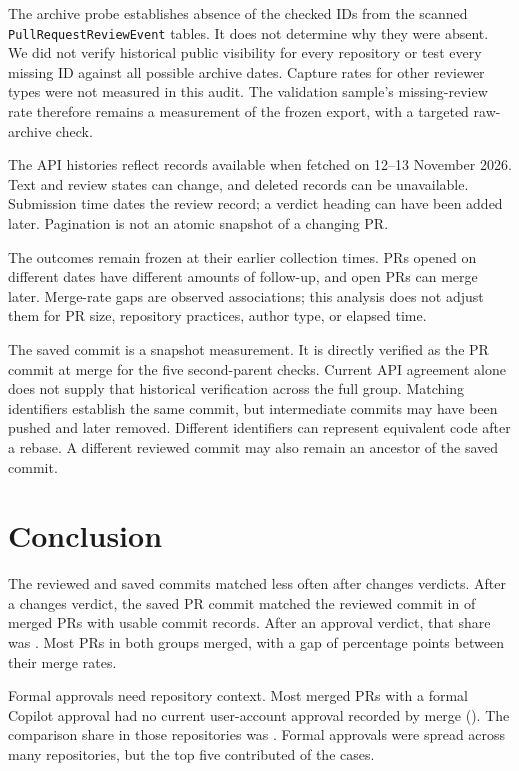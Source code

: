 \documentclass[11pt,letterpaper]{article}
\begin{document}
The archive probe establishes absence of the checked IDs from the
scanned \texttt{PullRequestReviewEvent} tables. It does not determine why
they were absent. We did not verify historical public visibility for
every repository or test every missing ID against all possible archive
dates. Capture rates for other reviewer types were not measured in this
audit. The validation sample's missing-review rate therefore remains
a measurement of the frozen export, with a targeted raw-archive check.

The API histories reflect records available when fetched on
12--13 November 2026. Text and review states can change, and deleted
records can be unavailable. Submission time dates the review record;
a verdict heading can have been added later. Pagination is not an
atomic snapshot of a changing PR.

The outcomes remain frozen at their earlier collection times. PRs
opened on different dates have different amounts of follow-up, and open
PRs can merge later. Merge-rate gaps are observed associations; this
analysis does not adjust them for PR size, repository practices,
author type, or elapsed time.

The saved commit is a snapshot measurement. It is directly verified as
the PR commit at merge for the five second-parent checks. Current API
agreement alone does not supply that historical verification across
the full group. Matching identifiers establish the same commit, but
intermediate commits may have been pushed and later removed. Different
identifiers can represent equivalent code after a rebase. A different
reviewed commit may also remain an ancestor of the saved commit.

\section{Conclusion}

The reviewed and saved commits matched less often after changes verdicts.
After a changes verdict, the saved PR commit matched the reviewed commit
in \ChangesMatchRate{} of merged PRs with usable commit records. After an
approval verdict, that share was \ReadyMatchRate{}. Most PRs in both
groups merged, with a gap of \MergeGapPP{} percentage points between
their merge rates.

Formal approvals need repository context. Most merged PRs with a formal
Copilot approval had no current user-account approval recorded by merge
(\FormalNoUserRate{}). The comparison share in those repositories was
\SharedBaselineRate{}. Formal approvals were spread across many
repositories, but the top five contributed \FormalRepoTopFiveRate{}
of the cases.
\end{document}
